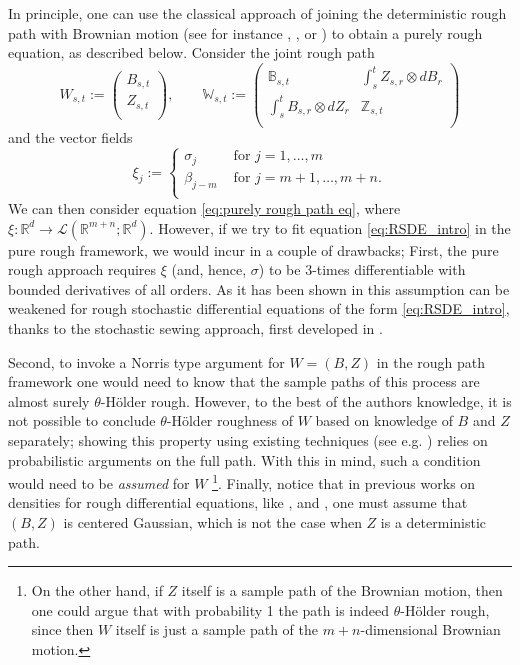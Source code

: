 \documentclass[11pt,a4paper]{article}
\newcommand{\R}{\mathbb{R}}
\theoremstyle{plain}
\begin{document}
In principle, one can use the classical approach of joining the deterministic rough path with Brownian motion (see for instance \cite{DFS17}, \cite{DOR13}, \cite{friz2020existence} or \cite{CN21}) to obtain a purely rough equation, as described below. 
Consider the joint rough path 
$$
W_{s,t} := 
\left(
\begin{array}{c}
B_{s,t} \\
Z_{s,t} \\
\end{array}
\right), 
\qquad 
\mathbb{W}_{s,t} := 
\left(
\begin{array}{cc}
\mathbb{B}_{s,t} & \int_s^t Z_{s,r} \otimes dB_r \\
\int_s^t B_{s,r} \otimes dZ_r & \mathbb{Z}_{s,t} \\
\end{array}
\right) 
$$
and the vector fields
$$
\xi_j := 
\left\{
\begin{array}{cc}
\sigma_j & \textrm{ for } j = 1, \dots, m \\
\beta_{j-m} & \textrm{ for } j = m+1, \dots, m+n. \\
\end{array}
\right.
$$
We can then consider equation \eqref{eq:purely rough path eq}, where $\xi : \R^d \rightarrow \mathscr{L}(\R^{m+n};\R^d)$.
However, if we try to fit equation \eqref{eq:RSDE_intro} in the pure rough framework, we would incur in a couple of drawbacks;
First, the pure rough approach requires $\xi$ (and, hence, $\sigma$) to be $3$-times differentiable with bounded derivatives of all orders. As it has been shown in \cite{FHL21} this assumption can be weakened for rough stochastic differential equations of the form \eqref{eq:RSDE_intro}, thanks to the stochastic sewing approach, first developed in \cite{LE20}.

Second, to invoke a Norris type argument for $W = (B,Z)$ in the rough path framework one would need to know that the sample paths of this process are almost surely $\theta$-Hölder rough. 
However, to the best of the authors knowledge, it is not possible to conclude $\theta$-Hölder roughness of $W$ based on knowledge of $B$ and $Z$ separately; showing this property using existing techniques (see e.g. \cite[Proposition 6.11]{FH20}) relies on probabilistic arguments on the full path. With this in mind, such a condition would need to be \emph{assumed} for $W$
\footnote{On the other hand, if $Z$ itself is a sample path of the Brownian motion, then one could argue that with probability 1 the path is indeed $\theta$-Hölder rough, since then $W$ itself is just a sample path of the $m+n$-dimensional Brownian motion.}.
Finally, notice that in previous works on densities for rough differential equations, like \cite{cass2010densities}, \cite{hairer2011malliavins} and \cite{cass2015smoothness}, one must assume that $(B,Z)$ is centered Gaussian, which is not the case when $Z$ is a deterministic path.
\end{document}
